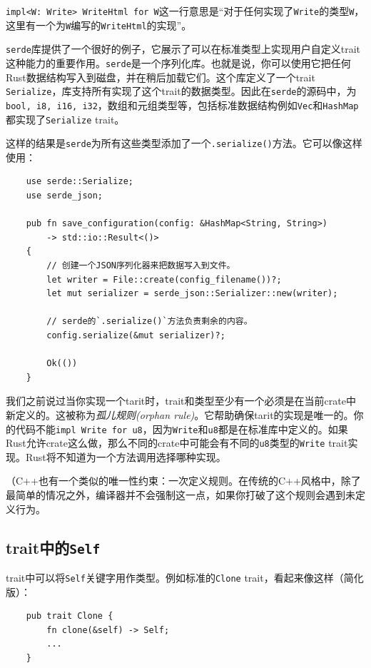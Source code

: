 \texttt{impl<W: Write> WriteHtml for W}这一行意思是“对于任何实现了\texttt{Write}的类型\texttt{W}，这里有一个为\texttt{W}编写的\texttt{WriteHtml}的实现”。

\texttt{serde}库提供了一个很好的例子，它展示了可以在标准类型上实现用户自定义trait这种能力的重要作用。\texttt{serde}是一个序列化库。也就是说，你可以使用它把任何Rust数据结构写入到磁盘，并在稍后加载它们。这个库定义了一个trait \texttt{Serialize}，库支持所有实现了这个trait的数据类型。因此在\texttt{serde}的源码中，为\texttt{bool, i8, i16, i32}，数组和元组类型等，包括标准数据结构例如\texttt{Vec}和\texttt{HashMap}都实现了\texttt{Serialize} trait。

这样的结果是\texttt{serde}为所有这些类型添加了一个\texttt{.serialize()}方法。它可以像这样使用：
\begin{verbatim}
    use serde::Serialize;
    use serde_json;

    pub fn save_configuration(config: &HashMap<String, String>) 
        -> std::io::Result<()>
    {
        // 创建一个JSON序列化器来把数据写入到文件。
        let writer = File::create(config_filename())?;
        let mut serializer = serde_json::Serializer::new(writer);

        // serde的`.serialize()`方法负责剩余的内容。
        config.serialize(&mut serializer)?;

        Ok(())
    }
\end{verbatim}

我们之前说过当你实现一个tarit时，trait和类型至少有一个必须是在当前crate中新定义的。这被称为\emph{孤儿规则(orphan rule)}。它帮助确保tarit的实现是唯一的。你的代码不能\texttt{impl Write for u8}，因为\texttt{Write}和\texttt{u8}都是在标准库中定义的。如果Rust允许crate这么做，那么不同的crate中可能会有不同的\texttt{u8}类型的\texttt{Write} trait实现。Rust将不知道为一个方法调用选择哪种实现。

（C++也有一个类似的唯一性约束：一次定义规则。在传统的C++风格中，除了最简单的情况之外，编译器并不会强制这一点，如果你打破了这个规则会遇到未定义行为。

\subsection{trait中的\texttt{Self}}
trait中可以将\texttt{Self}关键字用作类型。例如标准的\texttt{Clone} trait，看起来像这样（简化版）：
\begin{verbatim}
    pub trait Clone {
        fn clone(&self) -> Self;
        ...
    }
\end{verbatim}

